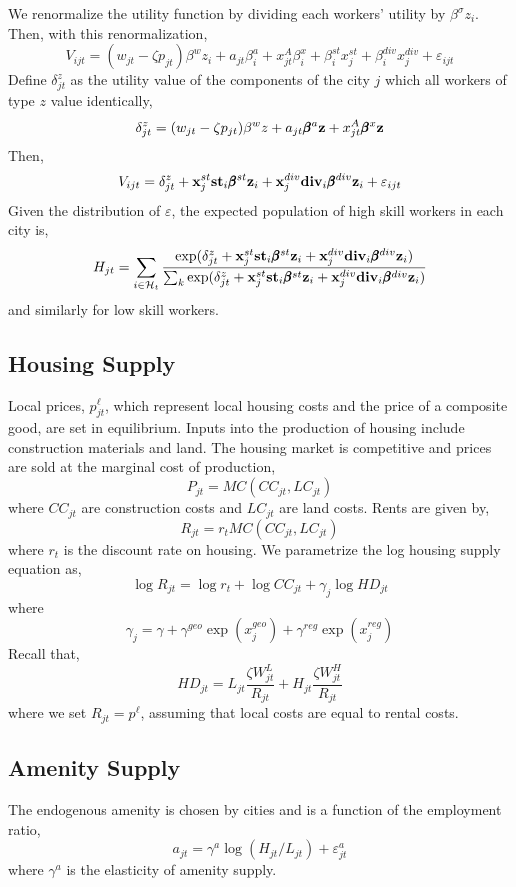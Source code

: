 \documentclass{article}
\begin{document}
We renormalize the utility function by dividing each workers' utility by $\beta^\sigma z_i$. Then, with this renormalization,
$$V_{ijt} = (w_{jt}-\zeta p_{jt})\beta^w z_i + a_{jt}\beta_i^a + x_{jt}^A\beta_i^x + \beta_i^{st}x_{j}^{st} + \beta_i^{div}x_j^{div} + \varepsilon_{ijt}$$ %
Define $\delta_{jt}^z$ as the utility value of the components of the city $j$ which all workers of type $z$ value identically,
$$\delta_{jt}^z = (w_{jt} - \zeta p_{jt})\beta^w z + a_{jt}\pmb{\beta}^a \mathbf{z} + x_{jt}^A\pmb{\beta}^x\mathbf{z}$$
Then,
$$V_{ijt} = \delta_{jt}^z + \mathbf{x}_j^{st}\mathbf{st}_i\pmb{\beta}^{st}\mathbf{z}_i+ \mathbf{x}_j^{div}\mathbf{div}_i\pmb{\beta}^{div}\mathbf{z}_i + \varepsilon_{ijt}$$
Given the distribution of $\varepsilon$, the expected population of high skill workers in each city is,
$$H_{jt} = \sum_{i\in\mathcal{H}_t} \frac{\exp(\delta_{jt}^z + \mathbf{x}_j^{st}\mathbf{st}_i\pmb{\beta}^{st}\mathbf{z}_i+ \mathbf{x}_j^{div}\mathbf{div}_i\pmb{\beta}^{div}\mathbf{z}_i)}{\sum_{k} \exp(\delta_{jt}^z + \mathbf{x}_j^{st}\mathbf{st}_i\pmb{\beta}^{st}\mathbf{z}_i+ \mathbf{x}_j^{div}\mathbf{div}_i\pmb{\beta}^{div}\mathbf{z}_i)}$$
and similarly for low skill workers.

\subsection{Housing Supply}
Local prices, $p^\ell_{jt}$, which represent local housing costs and the price of a composite good, are set in equilibrium. Inputs into the production of housing include construction materials and land. The housing market is competitive and prices are sold at the marginal cost of production,
$$P_{jt} = MC(CC_{jt}, LC_{jt})$$
where $CC_{jt}$ are construction costs and $LC_{jt}$ are land costs. Rents are given by,
$$R_{jt} = r_t MC(CC_{jt},LC_{jt})$$
where $r_t$ is the discount rate on housing. We parametrize the log housing supply equation as,
\begin{equation}
    \log R_{jt} = \log r_t + \log CC_{jt} + \gamma_j \log HD_{jt}
\end{equation}
where
$$\gamma_j = \gamma + \gamma^{geo}\exp(x_j^{geo}) + \gamma^{reg} \exp(x_j^{reg})$$
Recall that,
$$HD_{jt} = L_{jt} \frac{\zeta W_{jt}^L}{R_{jt}} + H_{jt} \frac{\zeta W_{jt}^H}{R_{jt}}$$
where we set $R_{jt} = p^\ell$, assuming that local costs are equal to rental costs.

\subsection{Amenity Supply}
The endogenous amenity is chosen by cities and is a function of the employment ratio,
$$a_{jt} = \gamma^a \log(H_{jt}/L_{jt}) + \varepsilon^a_{jt}$$
where $\gamma^a$ is the elasticity of amenity supply.
\end{document}
